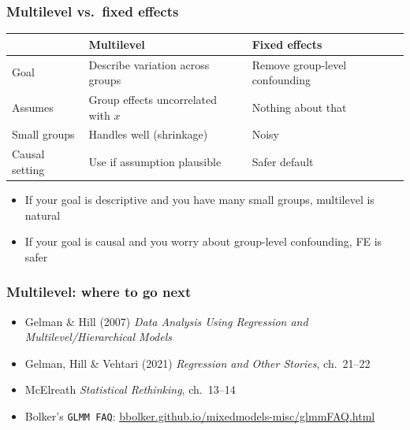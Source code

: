\begin{frame}
\frametitle{Multilevel vs.\ fixed effects}
\centering

\renewcommand{\arraystretch}{1.4}
\footnotesize
\begin{tabular}{p{3cm}p{3.5cm}p{3cm}}
\hline
 & \textbf{Multilevel} & \textbf{Fixed effects}\\
\hline
Goal & Describe variation across groups & Remove group-level confounding\\
Assumes & Group effects uncorrelated with $x$ & Nothing about that\\
Small groups & Handles well (shrinkage) & Noisy\\
Causal setting & Use if assumption plausible & Safer default\\
\hline
\end{tabular}

\vspace{15pt}

\begin{itemize}
\item \footnotesize If your goal is descriptive and you have many small groups, multilevel is natural
\item \footnotesize If your goal is causal and you worry about group-level confounding, FE is safer
\end{itemize}

\end{frame}

\begin{frame}
\frametitle{Multilevel: where to go next}
\centering

\begin{itemize}
\item Gelman \& Hill (2007) \textit{Data Analysis Using Regression and Multilevel/Hierarchical Models}
\item Gelman, Hill \& Vehtari (2021) \textit{Regression and Other Stories}, ch.\ 21--22
\item McElreath \textit{Statistical Rethinking}, ch.\ 13--14
\item Bolker's \texttt{GLMM FAQ}: \href{https://bbolker.github.io/mixedmodels-misc/glmmFAQ.html}{bbolker.github.io/mixedmodels-misc/glmmFAQ.html}
\end{itemize}

\end{frame}

